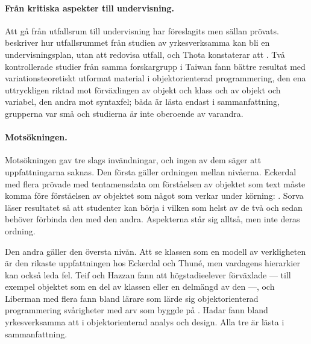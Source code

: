 \paragraph{Från kritiska aspekter till undervisning.}  Att gå från
utfallsrum till undervisning har föreslagits men sällan prövats.
\Textcite{Thompson2010} beskriver hur utfallsrummet från studien av
yrkesverksamma kan bli en undervisningsplan, utan att redovisa utfall, och
Thota konstaterar att .  Två kontrollerade studier
från samma forskargrupp i Taiwan fann bättre resultat med
variationsteoretiskt utformat material i objektorienterad programmering,
den ena uttryckligen riktad mot förväxlingen av objekt och klass och av
objekt och variabel\autocite{Chang2012VT}, den andra mot
syntaxfel\autocite{Lee2020VT}; båda är lästa endast i
sammanfattning,
grupperna var små och studierna är inte oberoende av varandra.

\paragraph{Motsökningen.}  Motsökningen gav tre slags invändningar, och
ingen av dem säger att uppfattningarna saknas.  Den första gäller
ordningen mellan nivåerna.  Eckerdal med flera prövade
med tentamensdata om förståelsen av objektet som text måste komma före
förståelsen av objektet som något som verkar under körning:
.  Sorva läser resultatet så att
studenter kan börja i vilken som helst av de två och sedan behöver
förbinda den med den andra\autocite[103]{Sorva2012VPS}.  Aspekterna står
sig alltså, men inte deras ordning.

Den andra gäller den översta nivån.  Att se klassen som en modell av
verkligheten är den rikaste uppfattningen hos Eckerdal och Thuné, men
vardagens hierarkier kan också leda fel.  Teif och Hazzan fann
att högstadieelever förväxlade  --- till exempel objektet som en del av klassen eller en
delmängd av den\autocite[30, 363]{Sorva2012VPS} ---, och
Liberman med flera fann bland lärare som lärde sig objektorienterad
programmering svårigheter med arv som byggde på
.  Hadar fann bland
yrkesverksamma att  i objektorienterad
analys och design.  Alla tre är lästa i sammanfattning.

